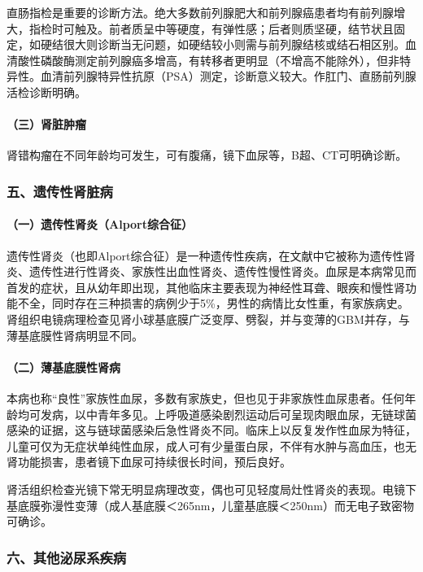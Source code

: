直肠指检是重要的诊断方法。绝大多数前列腺肥大和前列腺癌患者均有前列腺增大，指检时可触及。前者质呈中等硬度，有弹性感；后者则质坚硬，结节状且固定，如硬结很大则诊断当无问题，如硬结较小则需与前列腺结核或结石相区别。血清酸性磷酸酶测定前列腺癌多增高，有转移者更明显（不增高不能除外），但非特异性。血清前列腺特异性抗原（PSA）测定，诊断意义较大。作肛门、直肠前列腺活检诊断明确。

\paragraph{（三）肾脏肿瘤}

肾错构瘤在不同年龄均可发生，可有腹痛，镜下血尿等，B超、CT可明确诊断。

\subsubsection{五、遗传性肾脏病}

\paragraph{（一）遗传性肾炎（Alport综合征）}

遗传性肾炎（也即Alport综合征）是一种遗传性疾病，在文献中它被称为遗传性肾炎、遗传性进行性肾炎、家族性出血性肾炎、遗传性慢性肾炎。血尿是本病常见而首发的症状，且从幼年即出现，其他临床主要表现为神经性耳聋、眼疾和慢性肾功能不全，同时存在三种损害的病例少于5\%，男性的病情比女性重，有家族病史。肾组织电镜病理检查见肾小球基底膜广泛变厚、劈裂，并与变薄的GBM并存，与薄基底膜性肾病明显不同。

\paragraph{（二）薄基底膜性肾病}

本病也称“良性”家族性血尿，多数有家族史，但也见于非家族性血尿患者。任何年龄均可发病，以中青年多见。上呼吸道感染剧烈运动后可呈现肉眼血尿，无链球菌感染的证据，这与链球菌感染后急性肾炎不同。临床上以反复发作性血尿为特征，儿童可仅为无症状单纯性血尿，成人可有少量蛋白尿，不伴有水肿与高血压，也无肾功能损害，患者镜下血尿可持续很长时间，预后良好。

肾活组织检查光镜下常无明显病理改变，偶也可见轻度局灶性肾炎的表现。电镜下基底膜弥漫性变薄（成人基底膜＜265nm，儿童基底膜＜250nm）而无电子致密物可确诊。

\subsubsection{六、其他泌尿系疾病}

